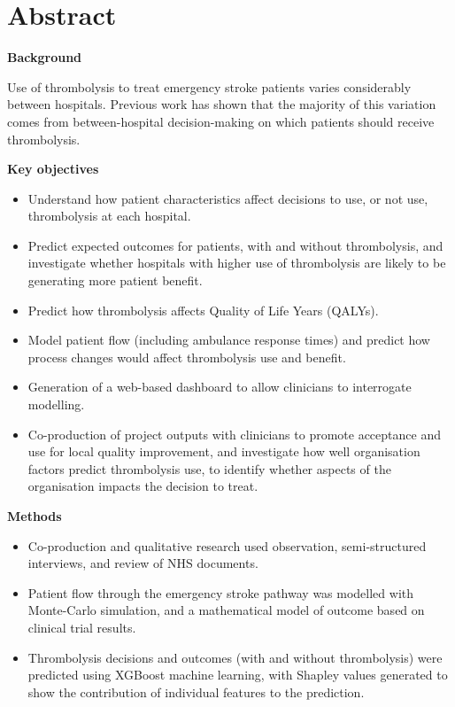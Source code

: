\section*{Abstract} %

\textbf{Background}

Use of thrombolysis to treat emergency stroke patients varies considerably between hospitals. Previous work has shown that the majority of this variation comes from between-hospital decision-making on which patients should receive thrombolysis.

\textbf{Key objectives}

\begin{itemize}

    \item Understand how patient characteristics affect decisions to use, or not use, thrombolysis at each hospital.

    \item Predict expected outcomes for patients, with and without thrombolysis, and investigate whether hospitals with higher use of thrombolysis are likely to be generating more patient benefit. 
    
    \item Predict how thrombolysis affects Quality of Life Years (QALYs).

    \item Model patient flow (including ambulance response times) and predict how process changes would affect thrombolysis use and benefit.

    \item Generation of a web-based dashboard to allow clinicians to interrogate modelling.

    \item Co-production of project outputs with clinicians to promote acceptance and use for local quality improvement, and investigate how well organisation factors predict thrombolysis use, to identify whether aspects of the organisation impacts the decision to treat.

\end{itemize}

\textbf{Methods}

\begin{itemize}

    \item Co-production and qualitative research used observation, semi-structured interviews, and review of NHS documents.

    \item Patient flow through the emergency stroke pathway was modelled with Monte-Carlo simulation, and a mathematical model of outcome based on  clinical trial results.

    \item  Thrombolysis decisions and outcomes (with and without thrombolysis) were predicted using XGBoost machine learning, with Shapley values  generated to show the contribution of individual features to the prediction.
    
\end{itemize}

